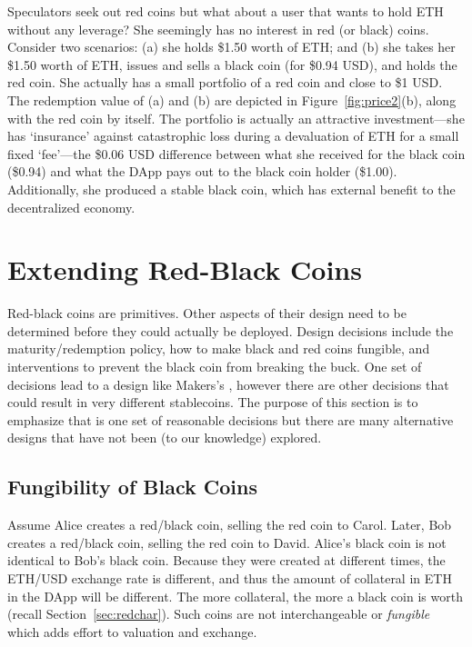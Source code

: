 Speculators seek out red coins but what about a user that wants to hold ETH without any leverage? She seemingly has no interest in red (or black) coins. Consider two scenarios: (a) she holds \$1.50 worth of ETH; and (b) she takes her \$1.50 worth of ETH, issues and sells a black coin (\eg for \$0.94 USD), and holds the red coin. She actually has a small portfolio of a red coin and close to \$1 USD. The redemption value of (a) and (b) are depicted in Figure~\ref{fig:price2}(b), along with the red coin by itself. The portfolio is actually an attractive investment---she has `insurance' against catastrophic loss during a devaluation of ETH for a small fixed `fee'---the \$0.06 USD difference between what she received for the black coin (\$0.94) and what the DApp pays out to the black coin holder (\$1.00). Additionally, she produced a stable black coin, which has external benefit to the decentralized economy. 



\section{Extending Red-Black Coins}

Red-black coins are primitives. Other aspects of their design need to be determined before they could actually be deployed. Design decisions include the maturity/redemption policy, how to make black and red coins fungible, and interventions to prevent the black coin from breaking the buck. One set of decisions lead to a design like Makers's \dai, however there are other decisions that could result in very different stablecoins. The purpose of this section is to emphasize that \dai is one set of reasonable decisions but there are many alternative designs that have not been (to our knowledge) explored.


\subsection{Fungibility of Black Coins}

Assume Alice creates a red/black coin, selling the red coin to Carol. Later, Bob creates a red/black coin, selling the red coin to David. Alice's black coin is not identical to Bob's black coin. Because they were created at different times, the ETH/USD exchange rate is different, and thus the  amount of collateral in ETH in the DApp will be different. The more collateral, the more a black coin is worth (recall Section~\ref{sec:redchar}). Such coins are not interchangeable or \textit{fungible} which adds effort to valuation and exchange. 

